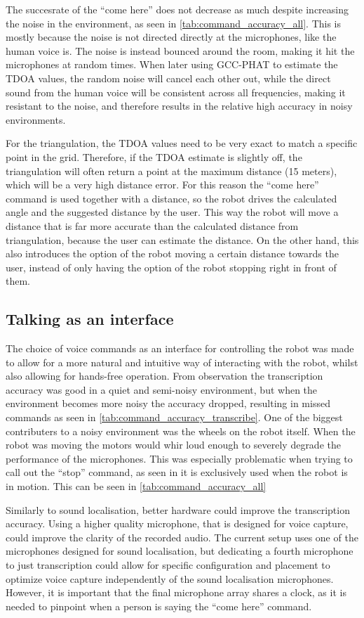 The succesrate of the ``come here'' does not decrease as much despite increasing the noise in the environment, as seen in \cref{tab:command_accuracy_all}. This is mostly because the noise is not directed directly at the microphones, like the human voice is. The noise is instead bounced around the room, making it hit the microphones at random times. When later using GCC-PHAT to estimate the TDOA values, the random noise will cancel each other out, while the direct sound from the human voice will be consistent across all frequencies, making it resistant to the noise, and therefore results in the relative high accuracy in noisy environments.

For the triangulation, the TDOA values need to be very exact to match a specific point in the grid. Therefore, if the TDOA estimate is slightly off, the triangulation will often return a point at the maximum distance (15 meters), which will be a very high distance error. For this reason the ``come here'' command is used together with a distance, so the robot drives the calculated angle and the suggested distance by the user. This way the robot will move a distance that is far more accurate than the calculated distance from triangulation, because the user can estimate the distance. On the other hand, this also introduces the option of the robot moving a certain distance towards the user, instead of only having the option of the robot stopping right in front of them.

\subsection{Talking as an interface}
The choice of voice commands as an interface for controlling the robot was made to allow for a more natural and intuitive way of interacting with the robot, whilst also allowing for hands-free operation. From observation the transcription accuracy was good in a quiet and semi-noisy environment, but when the environment becomes more noisy the accuracy dropped, resulting in missed commands as seen in \cref{tab:command_accuracy_transcribe}. One of the biggest contributers to a noisy environment was the wheels on the robot itself. When the robot was moving the motors would whir loud enough to severely degrade the performance of the microphones. This was especially problematic when trying to call out the ``stop'' command, as seen in it is exclusively used when the robot is in motion. This can be seen in \cref{tab:command_accuracy_all}

Similarly to sound localisation, better hardware could improve the transcription accuracy. Using a higher quality microphone, that is designed for voice capture, could improve the clarity of the recorded audio. The current setup uses one of the microphones designed for sound localisation, but dedicating a fourth microphone to just transcription could allow for specific configuration and placement to optimize voice capture independently of the sound localisation microphones. However, it is important that the final microphone array shares a clock, as it is needed to pinpoint when a person is saying the ``come here'' command.

